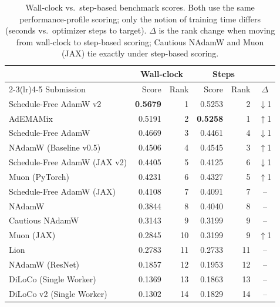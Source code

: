 \begin{table}[htbp]
  \centering
  \caption{Wall-clock vs.\ step-based benchmark scores. Both use the same performance-profile scoring; only the notion of training time differs (seconds vs.\ optimizer steps to target). $\Delta$ is the rank change when moving from wall-clock to step-based scoring; Cautious NAdamW and Muon (JAX) tie exactly under step-based scoring.}
  \label{tab:leaderboard_steps}
  \begin{tabular}{lrrrrc}
    \toprule
    & \multicolumn{2}{c}{Wall-clock} & \multicolumn{2}{c}{Steps} & \\
    \cmidrule(lr){2-3}\cmidrule(lr){4-5}
    Submission & Score & Rank & Score & Rank & $\Delta$ \\
    \midrule
    Schedule-Free AdamW v2 & \textbf{0.5679} & 1 & 0.5253 & 2 & $\downarrow$1 \\
    AdEMAMix & 0.5191 & 2 & \textbf{0.5258} & 1 & $\uparrow$1 \\
    Schedule-Free AdamW & 0.4669 & 3 & 0.4461 & 4 & $\downarrow$1 \\
    NAdamW (Baseline v0.5) & 0.4506 & 4 & 0.4545 & 3 & $\uparrow$1 \\
    Schedule-Free AdamW (JAX v2) & 0.4405 & 5 & 0.4125 & 6 & $\downarrow$1 \\
    Muon (PyTorch) & 0.4231 & 6 & 0.4327 & 5 & $\uparrow$1 \\
    Schedule-Free AdamW (JAX) & 0.4108 & 7 & 0.4091 & 7 & -- \\
    NAdamW & 0.3844 & 8 & 0.4040 & 8 & -- \\
    Cautious NAdamW & 0.3143 & 9 & 0.3199 & 9 & -- \\
    Muon (JAX) & 0.2845 & 10 & 0.3199 & 9 & $\uparrow$1 \\
    Lion & 0.2783 & 11 & 0.2733 & 11 & -- \\
    NAdamW (ResNet) & 0.1857 & 12 & 0.1953 & 12 & -- \\
    DiLoCo (Single Worker) & 0.1369 & 13 & 0.1863 & 13 & -- \\
    DiLoCo v2 (Single Worker) & 0.1302 & 14 & 0.1829 & 14 & -- \\
    \bottomrule
  \end{tabular}
\end{table}